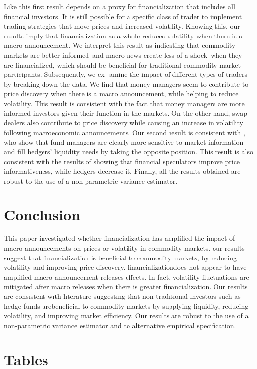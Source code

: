 \documentclass[12pt]{article}
\begin{document}
Like \citet{brunetti2009speculation} this first result depends on a proxy for financialization that includes all financial investors. It is still possible for a specific class of trader to implement trading strategies that move prices and increased volatility. Knowing this, our results imply that financialization as a whole reduces volatility when there is a macro announcement. We interpret this result as indicating that commodity markets are better informed–and macro news create less of a shock–when they are financialized, which should be beneficial for traditional commodity market participants. Subsequently, we ex- amine the impact of different types of traders by breaking down the data. We find that money managers seem to contribute to price discovery when there is a macro announcement, while helping to reduce volatility. This result is consistent with the fact that money managers are more informed investors given their function in the markets. On the other hand, swap dealers also contribute to price discovery while causing an increase in volatility following macroeconomic announcements. Our second result is consistent with \citet{cheng2012convective}, who show that fund managers are clearly more sensitive to market information and fill hedgers’ liquidity needs by taking the opposite position. This result is also consistent with the results of \citet{goldstein2014speculation} showing that financial speculators improve price informativeness, while hedgers decrease it. Finally, all the results obtained are robust to the use of a non-parametric variance estimator. 
 



\section{Conclusion} \label{sec:conclusion}
 This paper investigated whether financialization has amplified the impact of macro announcements on prices or volatility in commodity markets. our results suggest that financialization is beneficial to commodity markets, by reducing volatility and improving price discovery. financializationdoes not appear to have amplified macro announcement releases effects. In fact, volatility fluctuations are mitigated after macro releases when there is greater financialization. Our results are consistent with literature suggesting that non-traditional investors such as hedge funds arebeneficial to commodity markets by supplying liquidity, reducing volatility, and improving market efficiency. Our results are robust to the use of a non-parametric variance estimator and to alternative empirical specification.
\newpage

\section{Tables}

\end{document}
